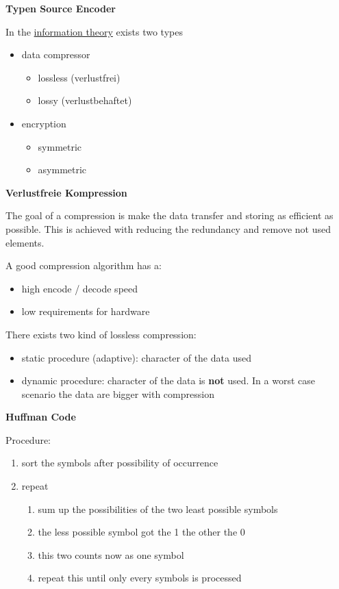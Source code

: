 \documentclass[11pt,twoside,twocolumn,landscape]{article}
\begin{document}
\textbf{Typen Source Encoder}

In the \href{../../../roam/20211001174201-information_theory.org}{information theory} exists two types
\begin{itemize}
\item data compressor
\begin{itemize}
\item lossless (verlustfrei)
\item lossy (verlustbehaftet)
\end{itemize}
\item encryption
\begin{itemize}
\item symmetric
\item asymmetric
\end{itemize}
\end{itemize}

\textbf{Verlustfreie Kompression}

The goal of a compression is make the data transfer and storing as efficient as possible. This is achieved with reducing the redundancy and remove not used elements.

A good compression algorithm has a:
\begin{itemize}
\item high encode / decode speed
\item low requirements for hardware
\end{itemize}


There exists two kind of lossless compression:
\begin{itemize}
\item static procedure (adaptive): character of the data used
\item dynamic procedure: character of the data is \textbf{not} used. In a worst case scenario the data are bigger with compression
\end{itemize}


\textbf{Huffman Code}

Procedure:
\begin{enumerate}
\item sort the symbols after possibility of occurrence
\item repeat
\begin{enumerate}
\item sum up the possibilities of the two least possible symbols
\item the less possible symbol got the 1 the other the 0
\item this two counts now as one symbol
\item repeat this until only every symbols is processed
\end{enumerate}
\end{enumerate}
\end{document}
